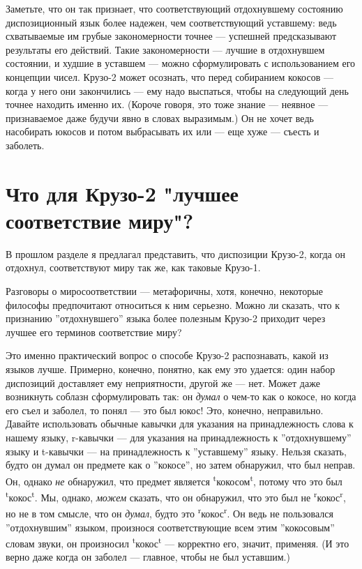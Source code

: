 \documentclass[11pt]{book}
\begin{document}
Заметьте, что он так признает, что соответствующий отдохнувшему состоянию диспозиционный язык более надежен, чем соответствующий уставшему: ведь схватываемые им грубые закономерности точнее --- успешней предсказывают результаты его действий. Такие закономерности --- лучшие в отдохнувшем состоянии, и худшие в уставшем --- можно сформулировать с использованием его концепции чисел. Крузо-2 может осознать, что перед собиранием кокосов --- когда у него они закончились --- ему надо выспаться, чтобы на следующий день точнее находить именно их. (Короче говоря, это тоже знание --- неявное --- признаваемое даже будучи явно в словах выразимым.) Он не хочет ведь насобирать юкосов и потом выбрасывать их или --- еще хуже --- съесть и заболеть.

\section{Что для Крузо-2 "лучшее соответствие миру"?}

В прошлом разделе я предлагал представить, что диспозиции Крузо-2, когда он отдохнул, соответствуют миру так же, как таковые Крузо-1.

Разговоры о миросоответствии --- метафоричны, хотя, конечно, некоторые философы предпочитают относиться к ним серьезно. Можно ли сказать, что к признанию ''отдохнувшего'' языка более полезным Крузо-2 приходит через лучшее его терминов соответствие миру?

Это именно практический вопрос о способе Крузо-2 распознавать, какой из языков лучше. Примерно, конечно, понятно, как ему это удается: один набор диспозиций доставляет ему неприятности, другой же --- нет. Может даже возникнуть соблазн сформулировать так: он \textit{думал} о чем-то как о кокосе, но когда его съел и заболел, то понял --- это был юкос! Это, конечно, неправильно. Давайте использовать обычные кавычки для указания на принадлежность слова к нашему языку, r-кавычки --- для указания на принадлежность к ''отдохнувшему'' языку и t-кавычки --- на принадлежность к ''уставшему'' языку. Нельзя сказать, будто он думал он предмете как о ''кокосе'', но затем обнаружил, что был неправ. Он, однако \textit{не} обнаружил, что предмет является \textsuperscript{t}кокосом\textsuperscript{t}, потому что это был \textsuperscript{t}кокос\textsuperscript{t}. Мы, однако, \textit{можем} сказать, что он обнаружил, что это был не \textsuperscript{r}кокос\textsuperscript{r}, но не в том смысле, что он \textit{думал}, будто это \textsuperscript{r}кокос\textsuperscript{r}. Он ведь не пользовался ''отдохнувшим'' языком, произнося соответствующие всем этим ''кокосовым'' словам звуки, он произносил \textsuperscript{t}кокос\textsuperscript{t} --- корректно его, значит, применяя. (И это верно даже когда он заболел --- главное, чтобы не был уставшим.)
\end{document}
